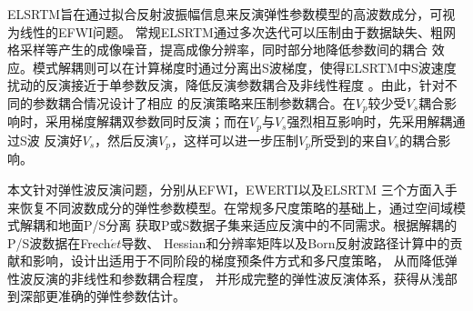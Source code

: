 \begin{cabstract}
	ELSRTM旨在通过拟合反射波振幅信息来反演弹性参数模型的高波数成分，可视为线性的EFWI问题。
	常规ELSRTM通过多次迭代可以压制由于数据缺失、粗网格采样等产生的成像噪音，提高成像分辨率，同时部分地降低参数间的耦合
	效应。模式解耦则可以在计算梯度时通过分离出S波梯度，使得ELSRTM中S波速度扰动的反演接近于单参数反演，降低反演参数耦合及非线性程度
	。由此，针对不同的参数耦合情况设计了相应
	的反演策略来压制参数耦合。在$V_p$较少受$V_s$耦合影响时，采用梯度解耦双参数同时反演；而在$V_p$与$V_s$强烈相互影响时，先采用解耦通过S波
	反演好$V_s$，然后反演$V_p$，这样可以进一步压制$V_p$所受到的来自$V_s$的耦合影响。

	本文针对弹性波反演问题，分别从EFWI，EWERTI以及ELSRTM
	三个方面入手来恢复不同波数成分的弹性参数模型。在常规多尺度策略的基础上，通过空间域模式解耦和地面P/S分离
	获取P或S数据子集来适应反演中的不同需求。根据解耦的P/S波数据在Frech$\acute{e}t$导数、
	Hessian和分辨率矩阵以及Born反射波路径计算中的贡献和影响，设计出适用于不同阶段的梯度预条件方式和多尺度策略，
	从而降低弹性波反演的非线性和参数耦合程度，
	并形成完整的弹性波反演体系，获得从浅部到深部更准确的弹性参数估计。


\end{cabstract}


